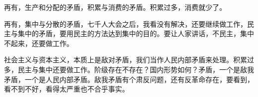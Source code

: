 再有，生产和分配的矛盾，积累与消费的矛盾。积累过多，消费就少了。

再有，集中与分散的矛盾，七千人大会之后，我看没有解决，还要继续做工作，民主与集中的矛盾，要用民主的方法达到集中的目的。要让人家讲话，不民主，集中不起来，还要做工作。

社会主义与资本主义，本质上是敌对矛盾，我们当作人民内部矛盾来处理。积累过多，民主与集中还要做工作。阶级存在不存在？国内形势如何？矛盾，一个是敌我矛盾，一个是人民内部矛盾。敌我矛盾有个肃反问题，还有反革命存在，要看到，看不到不好，看得太严重也不合乎事实。

